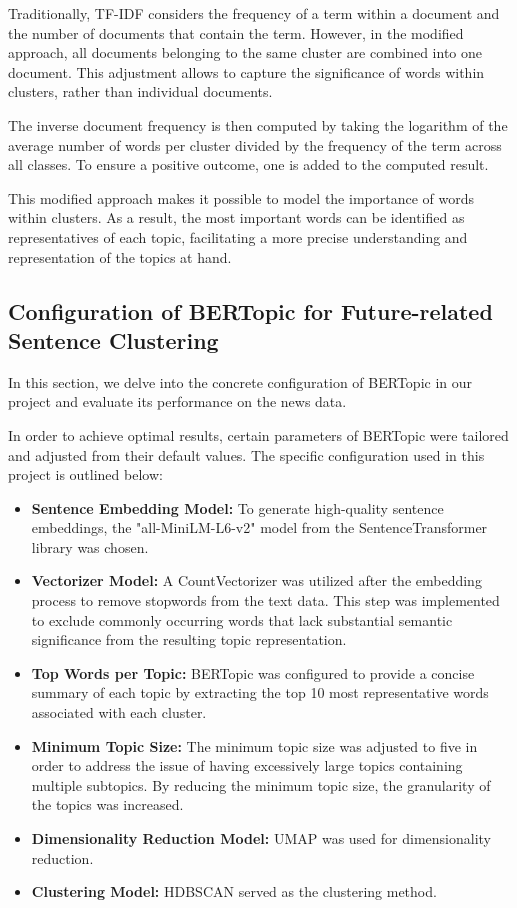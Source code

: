 \documentclass[a4paper,10pt]{report} %
\begin{document}
Traditionally, TF-IDF considers the frequency of a term within a document and the number of documents that contain the term. However, in the modified approach, all documents belonging to the same cluster are combined into one document. This adjustment allows to capture the significance of words within clusters, rather than individual documents.

The inverse document frequency is then computed by taking the logarithm of the average number of words per cluster divided by the frequency of the term across all classes. To ensure a positive outcome, one is added to the computed result.

This modified approach makes it possible to model the importance of words within clusters. As a result, the most important words can be identified as representatives of each topic, facilitating a more precise understanding and representation of the topics at hand. \cite{bertopic}

\subsection{Configuration of BERTopic for Future-related Sentence Clustering}
In this section, we delve into the concrete configuration of BERTopic in our project and evaluate its performance on the news data.

In order to achieve optimal results, certain parameters of BERTopic were tailored and adjusted from their default values. The specific configuration used in this project is outlined below:

\begin{itemize}
    \item \textbf{Sentence Embedding Model:} To generate high-quality sentence embeddings, the "all-MiniLM-L6-v2" model from the SentenceTransformer library was chosen.

    \item \textbf{Vectorizer Model:} A CountVectorizer was utilized after the embedding process to remove stopwords from the text data. This step was implemented to exclude commonly occurring words that lack substantial semantic significance from the resulting topic representation.

    \item \textbf{Top Words per Topic:} BERTopic was configured to provide a concise summary of each topic by extracting the top 10 most representative words associated with each cluster.

    \item \textbf{Minimum Topic Size:} The minimum topic size was adjusted to five in order to address the issue of having excessively large topics containing multiple subtopics. By reducing the minimum topic size, the granularity of the topics was increased.

    \item \textbf{Dimensionality Reduction Model:} UMAP was used for dimensionality reduction.

    \item \textbf{Clustering Model:} HDBSCAN served as the clustering method.
\end{itemize}
\end{document}
